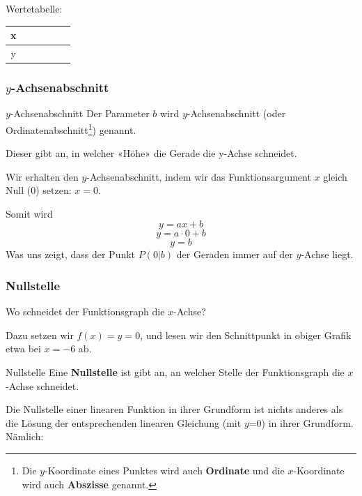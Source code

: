 \vspace{1cm}

Wertetabelle:
\begin{tabular}{c|p{2cm}|p{2cm}|p{2cm}|p{2cm}|p{2cm}}
   x  & & & & & \\
  \hline
   y  & & & & & \\
  \end{tabular} 


\newpage

\subsubsection{$y$-Achsenabschnitt}
\begin{definition}{$y$-Achsenabschnitt}{}
  Der Parameter $b$ wird $y$-Achsenabschnitt
(oder Ordinatenabschnitt\footnote{Die
    $y$-Koordinate eines Punktes wird auch
    \textbf{Ordinate} und die $x$-Koordinate wird auch
    \textbf{Abszisse}  genannt.}) genannt.
  
Dieser gibt an, in welcher «Höhe» die Gerade die y-Achse schneidet.
\end{definition}

Wir erhalten den $y$-Achsenabschnitt, indem wir das Funktionsargument $x$
gleich Null (0) setzen: $x=0$.

Somit wird
$$y=ax+b$$
$$y=a\cdot{}0+b$$
$$y=b$$
Was uns zeigt, dass der  Punkt $P(0|b)$ der Geraden immer auf der $y$-Achse liegt.

\newpage


\subsubsection{Nullstelle}
Wo schneidet der Funktionsgraph die $x$-Achse?

Dazu setzen wir $f(x)=y=0$, und lesen wir den Schnittpunkt in obiger Grafik etwa bei $x=-6$ ab.

\begin{definition}{Nullstelle}{}
  Eine \textbf{Nullstelle} ist gibt an, an welcher Stelle der Funktionsgraph die $x$-Achse schneidet.
\end{definition}

Die Nullstelle einer linearen Funktion in ihrer Grundform ist nichts
anderes als die Lösung der entsprechenden linearen Gleichung (mit
$y$=0) in ihrer Grundform. Nämlich:

